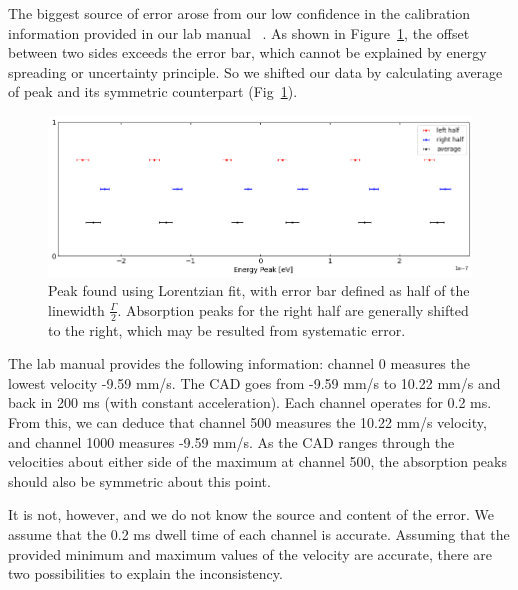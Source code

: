 \documentclass[letterpaper,12pt]{article}
\begin{document}
    The biggest source of error arose from our low confidence in the calibration information provided in our lab manual ~\cite{labManual}. As shown in Figure~\ref{fig:peak_compare}, the offset between two sides exceeds the error bar, which cannot be explained by energy spreading or uncertainty principle. So we shifted our data by calculating average of peak and its symmetric counterpart (Fig~\ref{fig:peak_compare}). 
    \begin{figure}[ht] 
            \centering \includegraphics[width=1\columnwidth]{peak_compare.png}
            \caption{
                    \label{fig:peak_compare} Peak found using Lorentzian fit, with error bar defined as half of the linewidth $\frac{\Gamma}{2}$. Absorption peaks for the right half are generally shifted to the right, which may be resulted from systematic error.
            }
    \end{figure}

    
    
    The lab manual provides the following information: channel 0 measures the lowest velocity -9.59 mm/s. The CAD goes from -9.59 mm/s to 10.22 mm/s and back in 200 ms (with constant acceleration). Each channel operates for 0.2 ms. From this, we can deduce that channel 500 measures the 10.22 mm/s velocity, and channel 1000 measures -9.59 mm/s. As the CAD ranges through the velocities about either side of the maximum at channel 500, the absorption peaks should also be symmetric about this point.
    
    It is not, however, and we do not know the source and content of the error. We assume that the 0.2 ms dwell time of each channel is accurate. Assuming that the provided minimum and maximum values of the velocity are accurate, there are two possibilities to explain the inconsistency. 
    
\end{document}
